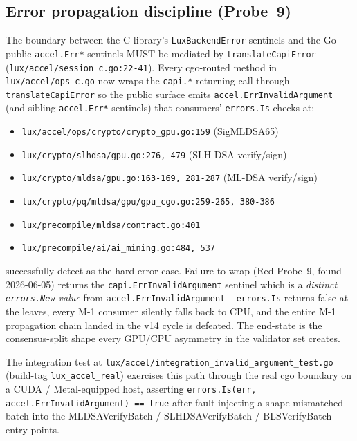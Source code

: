 \subsection{Error propagation discipline (Probe~9)}

The boundary between the C library's \texttt{LuxBackendError}
sentinels and the Go-public \texttt{accel.Err*} sentinels MUST be
mediated by \texttt{translateCapiError}
(\texttt{lux/accel/session\_c.go:22-41}). Every cgo-routed method
in \texttt{lux/accel/ops\_c.go} now wraps the
\texttt{capi.*}-returning call through \texttt{translateCapiError}
so the public surface emits \texttt{accel.ErrInvalidArgument} (and
sibling \texttt{accel.Err*} sentinels) that consumers'
\texttt{errors.Is} checks at:

\begin{itemize}[leftmargin=2em,nosep]
\item \texttt{lux/accel/ops/crypto/crypto\_gpu.go:159}
  (SigMLDSA65)
\item \texttt{lux/crypto/slhdsa/gpu.go:276, 479}
  (SLH-DSA verify/sign)
\item \texttt{lux/crypto/mldsa/gpu.go:163-169, 281-287}
  (ML-DSA verify/sign)
\item \texttt{lux/crypto/pq/mldsa/gpu/gpu\_cgo.go:259-265, 380-386}
\item \texttt{lux/precompile/mldsa/contract.go:401}
\item \texttt{lux/precompile/ai/ai\_mining.go:484, 537}
\end{itemize}

\noindent successfully detect as the hard-error case. Failure to
wrap (Red Probe~9, found 2026-06-05) returns the
\texttt{capi.ErrInvalidArgument} sentinel which is a \emph{distinct
\texttt{errors.New} value} from \texttt{accel.ErrInvalidArgument}
-- \texttt{errors.Is} returns false at the leaves, every M-1
consumer silently falls back to CPU, and the entire M-1
propagation chain landed in the v14 cycle is defeated. The
end-state is the consensus-split shape every GPU/CPU asymmetry
in the validator set creates.

The integration test at
\texttt{lux/accel/integration\_invalid\_argument\_test.go}
(build-tag \texttt{lux\_accel\_real}) exercises this path through
the real cgo boundary on a CUDA / Metal-equipped host, asserting
\texttt{errors.Is(err, accel.ErrInvalidArgument) == true} after
fault-injecting a shape-mismatched batch into the MLDSAVerifyBatch
/ SLHDSAVerifyBatch / BLSVerifyBatch entry points.

